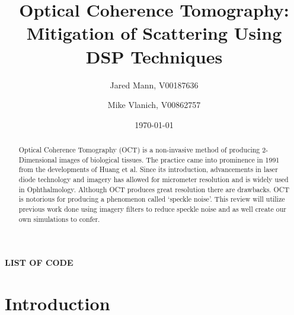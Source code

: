 \documentclass[%
reprint,
showpacs,preprintnumbers,
bibnotes,
amsmath,amssymb,
aps,
pra,
]{revtex4-1}
\begin{document}
	\renewcommand*{\lstlistlistingname}{List of Code}
	\renewcommand*\lstlistingname {Listing}

	\title{Optical Coherence Tomography: \\ Mitigation of Scattering Using DSP Techniques}

	\author{Jared Mann, V00187636}
	\author{Mike Vlanich, V00862757}

	\date{\today}%


	\begin{abstract}
		Optical Coherence Tomography (OCT) is a non-invasive method of producing 2-Dimensional images of biological tissues. The practice came into prominence in 1991 from the developments of Huang et al. Since its introduction, advancements in laser diode technology and imagery has allowed for micrometer resolution and is widely used in Ophthalmology.\cite{bhende_optical_2018} Although OCT produces great resolution there are drawbacks. OCT is notorious for producing a phenomenon called ‘speckle noise’. This review will utilize previous work done using imagery filters to reduce speckle noise and as well create our own simulations to confer.
	\end{abstract}

	\maketitle
	\tableofcontents
	\makeatletter
	\let\toc@pre\relax
	\let\toc@post\relax
	\makeatother
  	\listoffigures
  	\listoftables
	\makeatletter
	\renewcommand\lstlistoflistings{
		\begin{center}
			\textbf{\small \MakeUppercase{\lstlistlistingname}} \\[1.5ex]
		\end{center}
		\vspace{-1em}
	}
	\makeatother

  	\lstlistoflistings


	\section{\label{sec:level1}		Introduction}
\end{document}
